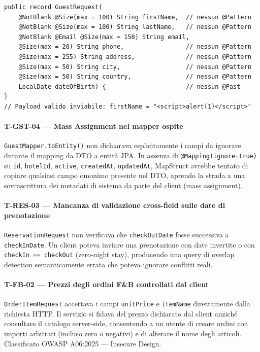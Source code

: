 ﻿\documentclass[a4paper,12pt]{report}
\begin{document}
\begin{insecurebox}[title={GuestRequest.java --- nessun \texttt{@Pattern} (baseline)}]
\begin{lstlisting}[style=java]
public record GuestRequest(
    @NotBlank @Size(max = 100) String firstName,  // nessun @Pattern
    @NotBlank @Size(max = 100) String lastName,   // nessun @Pattern
    @NotBlank @Email @Size(max = 150) String email,
    @Size(max = 20) String phone,                 // nessun @Pattern
    @Size(max = 255) String address,              // nessun @Pattern
    @Size(max = 50) String city,                  // nessun @Pattern
    @Size(max = 50) String country,               // nessun @Pattern
    LocalDate dateOfBirth) {                      // nessun @Past
}
// Payload valido inviabile: firstName = "<script>alert(1)</script>"
\end{lstlisting}
\end{insecurebox}

\paragraph{T-GST-04 — Mass Assignment nel mapper ospite}
\texttt{GuestMapper.toEntity()} non dichiarava esplicitamente i campi da ignorare durante
il mapping da DTO a entità JPA. In assenza di \texttt{@Mapping(ignore=true)} su
\texttt{id}, \texttt{hotelId}, \texttt{active}, \texttt{createdAt}, \texttt{updatedAt},
MapStruct avrebbe tentato di copiare qualsiasi campo omonimo presente nel DTO, aprendo
la strada a una sovrascrittura dei metadati di sistema da parte del client (mass assignment).

\paragraph{T-RES-03 — Mancanza di validazione cross-field sulle date di prenotazione}
\texttt{ReservationRequest} non verificava che \texttt{checkOutDate} fosse successiva a
\texttt{checkInDate}. Un client poteva inviare una prenotazione con date invertite o con
\texttt{checkIn == checkOut} (zero-night stay), producendo una query di overlap detection
semanticamente errata che poteva ignorare conflitti reali.

\paragraph{T-FB-02 — Prezzi degli ordini F\&B controllati dal client}
\texttt{OrderItemRequest} accettava i campi \texttt{unitPrice} e \texttt{itemName}
direttamente dalla richiesta HTTP. Il servizio si fidava del prezzo dichiarato dal client
anziché consultare il catalogo server-side, consentendo a un utente di creare ordini con
importi arbitrari (incluso zero o negativi) e di alterare il nome degli articoli.
Classificato OWASP A06:2025 --- Insecure Design.
\end{document}
